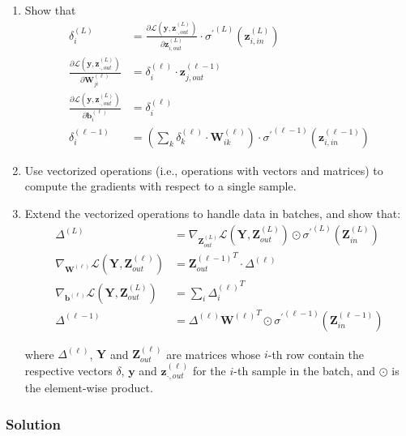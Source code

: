 \documentclass[
  a4paper,
]{article}
\begin{document}
\begin{enumerate}
\item Show that
\begin{align}
\delta^{(L)}_i &= \frac{\partial\mathcal{L}(\textbf{y},\textbf{z}^{(L)}_{\cdot,out})}{\partial\textbf{z}^{(L)}_{i,out}}
\cdot{\sigma^\prime}^{(L)}(\textbf{z}^{(L)}_{i,in})
\\
\label{eq:dldwji}
\frac{\partial \mathcal{L}(\textbf{y},\textbf{z}^{(L)}_{\cdot,out})}{\partial \textbf{W}^{(\ell)}_{ji}}&=\delta^{(\ell)}_i\cdot\textbf{z}^{(\ell-1)}_{j,out} \\
\frac{\partial \mathcal{L}(\textbf{y},\textbf{z}^{(L)}_{\cdot,out})}{\partial \textbf{b}^{(\ell)}_{i}}&=\delta^{(\ell)}_i \\
\label{eq:deltas}
\delta^{(\ell-1)}_i&=\left(\sum_k\delta^{(\ell)}_k\cdot\textbf{W}^{(\ell)}_{ik}\right)\cdot{\sigma^\prime}^{(\ell-1)}(\textbf{z}^{(\ell-1)}_{i,in})
\end{align}

\item Use vectorized operations (i.e., operations with vectors and matrices) to compute the gradients with respect to a single sample.

\item Extend the vectorized operations to handle data in batches, and show that:
\begin{align}
\Delta^{(L)}&=\nabla_{\textbf{Z}^{(L)}_{out}}\mathcal{L}(\textbf{Y},\textbf{Z}^{(L)}_{out})\odot{\sigma^\prime}^{(L)}(\textbf{Z}^{(L)}_{in}) \\
\nabla_{\textbf{W}^{(\ell)}}\mathcal{L}(\textbf{Y},\textbf{Z}^{(\ell)}_{out})&={\textbf{Z}^{(\ell-1)}_{out}}^T \cdot\Delta^{(\ell)} \\
\nabla_{\textbf{b}^{(\ell)}}\mathcal{L}(\textbf{Y},\textbf{Z}^{(L)}_{out})&=\sum_i {\Delta^{(\ell)}_i}^T \\
\Delta^{(\ell-1)}&=\Delta^{(\ell)}{\textbf{W}^{(\ell)}}^T\odot{\sigma^\prime}^{(\ell-1)}(\textbf{Z}^{(\ell-1)}_{in})
\end{align}

where $\Delta^{(\ell)}$, $\textbf{Y}$ and $\textbf{Z}^{(\ell)}_{out}$ are matrices whose $i$-th row contain the respective vectors $\delta$, $\textbf{y}$ and $\textbf{z}^{(\ell)}_{\cdot,out}$ for the $i$-th sample in the batch, and $\odot$ is the element-wise product.
\end{enumerate}

\hypertarget{solution}{%
\subsubsection{Solution}\label{solution}}
\end{document}

